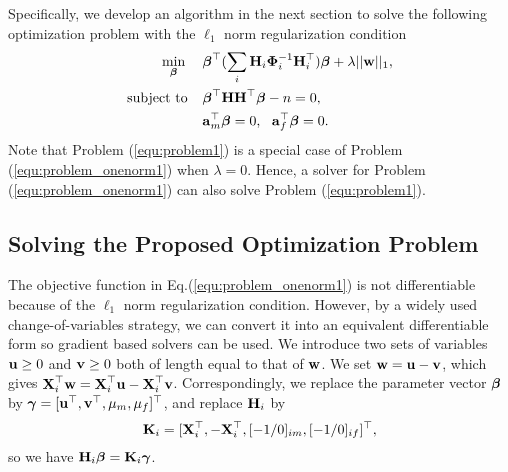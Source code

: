 \documentclass[10pt,letterpaper]{article}
\newcommand{\matrx}[1]{\ensuremath\boldsymbol{\rm #1}}
\newcommand{\vect}[1]{\ensuremath\boldsymbol{\rm #1}}
\begin{document}
Specifically, we develop an algorithm in the next section to solve the following optimization problem with the $\ell_1$ norm regularization condition
\begin{equation}
\label{equ:problem_onenorm1}
\begin{split}
\min_{\vect \beta} \phantom{aa} & \vect \beta^\top (\sum_i \matrx H_i \matrx \Phi_i^{-1} \matrx H_i^\top)\vect \beta + \lambda ||\vect w||_1, \\
\mbox{subject to} \phantom{aa} & \vect \beta^\top \matrx H \matrx H^\top \vect \beta - n = 0,  \\
                               & \vect a_m^\top \vect \beta = 0,~~\vect a_f^\top \vect \beta = 0.
\end{split}
\end{equation}
Note that Problem (\ref{equ:problem1}) is a special case of Problem (\ref{equ:problem_onenorm1}) when $\lambda=0$. Hence, a solver for Problem (\ref{equ:problem_onenorm1}) can also solve Problem (\ref{equ:problem1}).

\subsection*{Solving the Proposed Optimization Problem}
\label{optimization}
The objective function in Eq.(\ref{equ:problem_onenorm1}) is not differentiable because of the $\ell_1$ norm regularization condition. However, by a widely used change-of-variables strategy, we can convert it into an equivalent differentiable form so gradient based solvers can be used. We introduce two sets of variables $\vect u \ge 0$ and $\vect v \ge 0$ both of length equal to that of $\vect w$. We set $\vect w = \vect u - \vect v$, which gives $\matrx X_i^\top \vect w = \matrx X_i^\top \vect u - \matrx X_i^\top \vect v$. Correspondingly, we replace the parameter vector $\vect \beta$ by $
\vect \gamma = [\vect u^\top, \vect v^\top, \mu_m, \mu_f]^\top$, and replace $\matrx H_i$ by 
\begin{equation*}
\matrx K_i=[\matrx X_i^\top, -\matrx X_i^\top, [-1/0]_{im},[-1/0]_{if}]^\top,
\end{equation*}
so we have $\matrx H_i \vect \beta =  \matrx K_i \vect \gamma$. 
\end{document}
